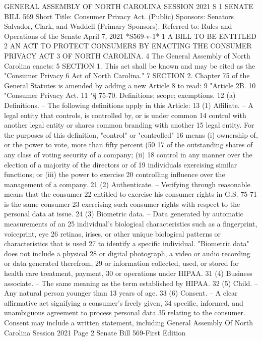 GENERAL ASSEMBLY OF NORTH CAROLINA
SESSION 2021
S 1
SENATE BILL 569
Short Title: Consumer Privacy Act. (Public)
Sponsors: Senators Salvador, Clark, and Waddell (Primary Sponsors).
Referred to: Rules and Operations of the Senate
April 7, 2021
*S569-v-1*
1 A BILL TO BE ENTITLED
2 AN ACT TO PROTECT CONSUMERS BY ENACTING THE CONSUMER PRIVACY ACT
3 OF NORTH CAROLINA.
4 The General Assembly of North Carolina enacts:
5 SECTION 1. This act shall be known and may be cited as the "Consumer Privacy
6 Act of North Carolina."
7 SECTION 2. Chapter 75 of the General Statutes is amended by adding a new Article
8 to read:
9 "Article 2B.
10 "Consumer Privacy Act.
11 "§ 75-70. Definitions; scope; exemptions.
12 (a) Definitions. – The following definitions apply in this Article:
13 (1) Affiliate. – A legal entity that controls, is controlled by, or is under common
14 control with another legal entity or shares common branding with another
15 legal entity. For the purposes of this definition, "control" or "controlled"
16 means (i) ownership of, or the power to vote, more than fifty percent (50%
17 of the outstanding shares of any class of voting security of a company; (ii)
18 control in any manner over the election of a majority of the directors or of
19 individuals exercising similar functions; or (iii) the power to exercise
20 controlling influence over the management of a company.
21 (2) Authenticate. – Verifying through reasonable means that the consumer
22 entitled to exercise his consumer rights in G.S. 75-71 is the same consumer
23 exercising such consumer rights with respect to the personal data at issue.
24 (3) Biometric data. – Data generated by automatic measurements of an
25 individual's biological characteristics such as a fingerprint, voiceprint, eye
26 retinas, irises, or other unique biological patterns or characteristics that is used
27 to identify a specific individual. "Biometric data" does not include a physical
28 or digital photograph, a video or audio recording or data generated therefrom,
29 or information collected, used, or stored for health care treatment, payment,
30 or operations under HIPAA.
31 (4) Business associate. – The same meaning as the term established by HIPAA.
32 (5) Child. – Any natural person younger than 13 years of age.
33 (6) Consent. – A clear affirmative act signifying a consumer's freely given,
34 specific, informed, and unambiguous agreement to process personal data
35 relating to the consumer. Consent may include a written statement, including 
General Assembly Of North Carolina Session 2021
Page 2 Senate Bill 569-First Edition
